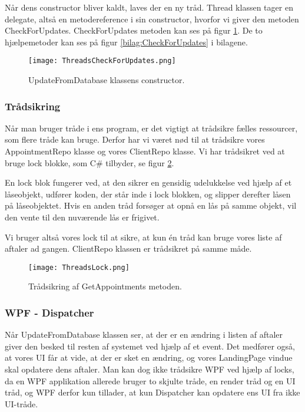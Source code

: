 Når dens constructor bliver kaldt, laves der en ny tråd.
Thread klassen tager en delegate, altså en metodereference i sin constructor, hvorfor vi giver den metoden CheckForUpdates.
CheckForUpdates metoden kan ses på figur \ref{fig:threadsUpdate}.
De to hjælpemetoder kan ses på figur \ref{bilag:CheckForUpdates} i bilagene.

\begin{figure}[H]
    \caption{UpdateFromDatabase klassens constructor.}
    \centering
        \texttt{[image: ThreadsCheckForUpdates.png]}
    \label{fig:threadsUpdate}
\end{figure}

\subsubsection{Trådsikring}
Når man bruger tråde i ens program, er det vigtigt at trådsikre fælles ressourcer, som flere tråde kan bruge.
Derfor har vi været nød til at trådsikre vores AppointmentRepo klasse og vores ClientRepo klasse.
Vi har trådsikret ved at bruge lock blokke, som C\# tilbyder, se figur \ref{fig:threadsLock}.

En lock blok fungerer ved, at den sikrer en gensidig udelukkelse ved hjælp af et låseobjekt, udfører koden, der står inde i lock blokken, og slipper derefter låsen på låseobjektet.
Hvis en anden tråd forsøger at opnå en lås på samme objekt, vil den vente til den nuværende lås er frigivet.

Vi bruger altså vores lock til at sikre, at kun én tråd kan bruge vores liste af aftaler ad gangen.
ClientRepo klassen er trådsikret på samme måde.

\begin{figure}[h]
    \caption{Trådsikring af GetAppointments metoden.}
    \centering
        \texttt{[image: ThreadsLock.png]}
    \label{fig:threadsLock}
\end{figure}

\subsubsection{WPF - Dispatcher}

Når UpdateFromDatabase klassen ser, at der er en ændring i listen af aftaler giver den besked til resten af systemet ved hjælp af et event.
Det medfører også, at vores UI får at vide, at der er sket en ændring, og vores LandingPage vindue skal opdatere dens aftaler.
Man kan dog ikke trådsikre WPF ved hjælp af locks, da en WPF applikation allerede bruger to skjulte tråde, en render tråd og en UI tråd, og WPF derfor kun tillader, at kun Dispatcher kan opdatere ens UI fra ikke UI-tråde.\cite{wpfdispatcher}

